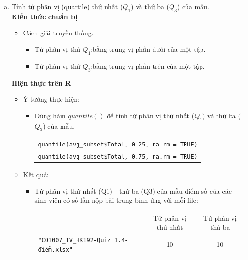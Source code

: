 \documentclass[a4paper]{article}
\theoremstyle{definition}
\begin{document}
\begin{enumerate}[a)]
\begin{itemize}
\begin{itemize}
\begin{center}
\begin{tabular}{l c c}
                \end{tabular}
            \end{center}
        \end{itemize}
    \end{itemize}
    \bf\item Tính tứ phân vị (quartile) thứ nhất ($Q_1$) và thứ ba ($Q_3$) của mẫu.\\[6pt]
    \bf Kiến thức chuẩn bị\normalfont
    \begin{itemize}
        \item Cách giải truyền thống:
        \begin{itemize}
            \item Tứ phân vị thứ $Q_1$:bằng trung vị phần dưới của một tập.
            \item Tứ phân vị thứ $Q_3$:bằng trung vị phần trên của một tập.
        \end{itemize}
    \end{itemize}
    \bf Hiện thực trên R\normalfont
    \begin{itemize}
        \item Ý tưởng thực hiện:
        \begin{itemize}
            \item Dùng hàm $quantile()$ để tính tứ phân vị thứ nhất ($Q_1$) và thứ ba ($Q_3$) của mẫu.
            \begin{center}
                \begin{tabular}{p{13cm}}
                    \texttt{quantile(avg\_subset\$Total, 0.25, na.rm = TRUE)}\\
                    \texttt{quantile(avg\_subset\$Total, 0.75, na.rm = TRUE)}
                \end{tabular}
            \end{center}
        \end{itemize}
        \item Kết quả:
        \begin{itemize}
            \item Tứ phân vị thứ nhất (Q1) - thứ ba (Q3) của mẫu điểm số của các sinh viên có số lần nộp bài trung bình ứng với mỗi file:
            \begin{center}
                \begin{tabular}{l c c}
                     & Tứ phân vị thứ nhất & Tứ phân vị thứ ba\\
                     \texttt{"CO1007\_TV\_HK192-Quiz 1.4-điểm.xlsx"} & 10 & 10\\ 

\end{tabular}
\end{center}
\end{itemize}
\end{itemize}
\end{enumerate}
\end{document}
